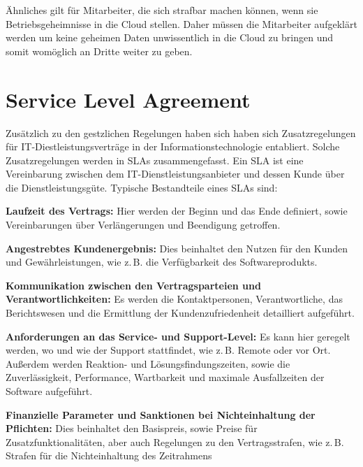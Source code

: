 \"Ahnliches gilt f\"ur Mitarbeiter, die sich strafbar machen k\"onnen, wenn sie Betriebsgeheimnisse in die Cloud stellen. Daher m\"ussen die Mitarbeiter aufgekl\"art werden um keine geheimen Daten unwissentlich in die Cloud zu bringen und somit wom\"oglich an Dritte weiter zu geben.

\section{Service Level Agreement}
Zus\"atzlich zu den gestzlichen Regelungen haben sich haben sich Zusatzregelungen  f\"ur IT-Diestleistungsvertr\"age in der Informationstechnologie entabliert. Solche Zusatzregelungen werden in SLAs zusammengefasst.
Ein SLA ist eine Vereinbarung zwischen dem IT-Dienstleistungsanbieter und dessen Kunde \"uber die Dienstleistungsg\"ute.\newline
Typische Bestandteile eines SLAs sind:
\begin{seList}
\item \textbf{Laufzeit des Vertrags:}\newline
Hier werden der Beginn und das Ende definiert, sowie Vereinbarungen \"uber Verl\"angerungen und Beendigung getroffen.
\item \textbf{Angestrebtes Kundenergebnis:}\newline
Dies beinhaltet den Nutzen f\"ur den Kunden und Gew\"ahrleistungen, wie z.\,B. die Verf\"ugbarkeit des Softwareprodukts.
\item \textbf{Kommunikation zwischen den Vertragsparteien und Verantwortlichkeiten:}\newline	
Es werden die Kontaktpersonen, Verantwortliche, das Berichtswesen und die Ermittlung der Kundenzufriedenheit detailliert aufgef\"uhrt.
\item \textbf{Anforderungen an das Service- und Support-Level:}\newline	
Es kann hier geregelt werden, wo und wie der Support stattfindet, wie z.\,B. Remote oder vor Ort. Au{\ss}erdem werden Reaktion- und L\"osungsfindungszeiten, sowie die Zuverl\"assigkeit, Performance, Wartbarkeit und maximale Ausfallzeiten der Software aufgef\"uhrt.
\item \textbf{Finanzielle Parameter und Sanktionen bei Nichteinhaltung der Pflichten:}\newline	
Dies beinhaltet den Basispreis, sowie Preise f\"ur Zusatzfunktionalit\"aten, aber auch Regelungen zu den Vertragsstrafen, wie z.\,B. Strafen f\"ur die Nichteinhaltung des Zeitrahmens
\end{seList}

